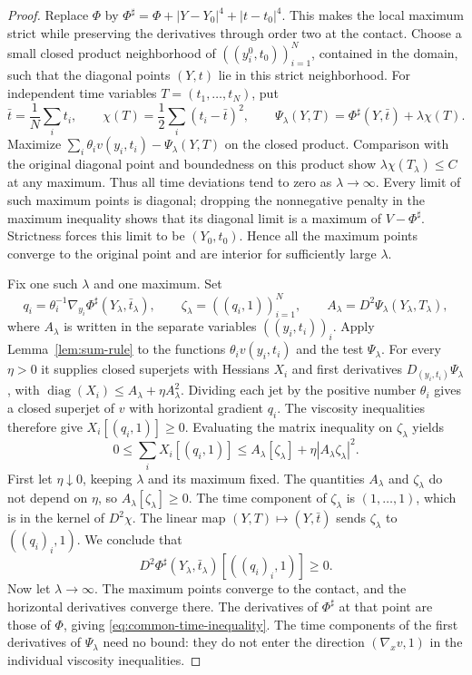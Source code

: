 \documentclass[11pt]{article}
\numberwithin{equation}{section}
\theoremstyle{definition}
\theoremstyle{remark}
\begin{document}
\begin{proof}
Replace $\Phi$ by
$\Phi^\sharp=\Phi+|Y-Y_0|^4+|t-t_0|^4$. This makes the local
maximum strict while preserving the derivatives through order
two at the contact. Choose a small closed product neighborhood
of $((y_i^0,t_0))_{i=1}^N$, contained in the domain, such that
the diagonal points $(Y,t)$ lie in this strict neighborhood.
For independent time variables $T=(t_1,\ldots,t_N)$, put
\[
  \bar t=\frac1N\sum_i t_i,\qquad
  \chi(T)=\frac12\sum_i(t_i-\bar t)^2,\qquad
  \Psi_\lambda(Y,T)=\Phi^\sharp(Y,\bar t)+\lambda\chi(T).
\]
Maximize
$\sum_i\theta_i v(y_i,t_i)-\Psi_\lambda(Y,T)$ on the closed
product. Comparison with the original diagonal point and
boundedness on this product show
$\lambda\chi(T_\lambda)\le C$ at any maximum. Thus all
time deviations tend to zero as $\lambda\to\infty$. Every
limit of such maximum points is diagonal; dropping the
nonnegative penalty in the maximum inequality shows that its
diagonal limit is a maximum of $V-\Phi^\sharp$. Strictness
forces this limit to be $(Y_0,t_0)$. Hence all the maximum
points converge to the original point and are interior for
sufficiently large $\lambda$.

Fix one such $\lambda$ and one maximum. Set
\[
  q_i=\theta_i^{-1}\nabla_{y_i}
             \Phi^\sharp(Y_\lambda,\bar t_\lambda),
  \qquad
  \zeta_\lambda=((q_i,1))_{i=1}^N,\qquad
  A_\lambda=D^2\Psi_\lambda(Y_\lambda,T_\lambda),
\]
where $A_\lambda$ is written in the separate variables
$((y_i,t_i))_i$. Apply Lemma~\ref{lem:sum-rule} to the
functions $\theta_i v(y_i,t_i)$ and the test $\Psi_\lambda$.
For every $\eta>0$ it supplies closed superjets with Hessians
$X_i$ and first derivatives $D_{(y_i,t_i)}\Psi_\lambda$, with
$\operatorname{diag}(X_i)\le A_\lambda+\eta A_\lambda^2$.
Dividing each jet by the positive number $\theta_i$ gives a
closed superjet of $v$ with horizontal gradient $q_i$.
The viscosity inequalities therefore give
$X_i[(q_i,1)]\ge0$. Evaluating the matrix inequality on
$\zeta_\lambda$ yields
\[
  0\le\sum_iX_i[(q_i,1)]
     \le A_\lambda[\zeta_\lambda]
                   +\eta|A_\lambda\zeta_\lambda|^2.
\]
First let $\eta\downarrow0$, keeping $\lambda$ and its maximum
fixed. The quantities $A_\lambda$ and $\zeta_\lambda$ do not
depend on $\eta$, so $A_\lambda[\zeta_\lambda]\ge0$.
The time component of $\zeta_\lambda$ is $(1,\ldots,1)$,
which is in the kernel of $D^2\chi$. The linear map
$(Y,T)\mapsto(Y,\bar t)$ sends $\zeta_\lambda$ to
$((q_i)_i,1)$. We conclude that
\[
  D^2\Phi^\sharp(Y_\lambda,\bar t_\lambda)
       [((q_i)_i,1)]\ge0.
\]
Now let $\lambda\to\infty$. The maximum points converge to the
contact, and the horizontal derivatives converge there.
The derivatives of $\Phi^\sharp$ at that point are those of
$\Phi$, giving \eqref{eq:common-time-inequality}.
The time components of the first derivatives of
$\Psi_\lambda$ need no bound: they do not enter the direction
$(\nabla_xv,1)$ in the individual viscosity inequalities.
\end{proof}
\end{document}
